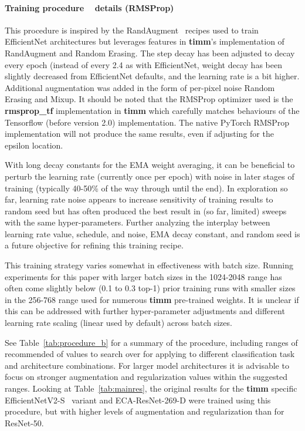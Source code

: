 \paragraph{Training procedure \Bp~ details (RMSProp)}
This procedure is inspired by the RandAugment~\cite{Cubuk2019RandAugmentPA} recipes used to train EfficientNet architectures but leverages features in \textbf{timm}’s implementation of RandAugment and Random Erasing. The step decay has been adjusted to decay every epoch (instead of every 2.4 as with EfficientNet, weight decay has been slightly decreased from EfficientNet defaults, and the learning rate is a bit higher. Additional augmentation was added in the form of per-pixel noise Random Erasing and Mixup. It should be noted that the RMSProp optimizer used is the \textbf{rmsprop\_tf} implementation in \textbf{timm} which carefully matches behaviours of the Tensorflow (before version 2.0) implementation. The native PyTorch RMSProp implementation will not produce the same results, even if adjusting for the epsilon location.

With long decay constants for the EMA weight averaging, it can be beneficial to perturb the learning rate (currently once per epoch) with noise in later stages of training (typically 40-50\% of the way through until the end). In exploration so far, learning rate noise appears to increase sensitivity of training results to random seed but has often produced the best result in (so far, limited) sweeps with the same hyper-parameters. Further analyzing the interplay between learning rate value, schedule, and noise, EMA decay constant, and random seed is a future objective for refining this training recipe.

This training strategy varies somewhat in effectiveness with batch size. Running experiments for this paper with larger batch sizes in the 1024-2048 range has often come slightly below (0.1 to 0.3 top-1) prior training runs with smaller sizes in the 256-768 range used for numerous \textbf{timm} pre-trained weights. It is unclear if this can be addressed with further hyper-parameter adjustments and different learning rate scaling (linear used by default) across batch sizes.

See Table~\ref{tab:procedure_b} for a summary of the procedure, including ranges of recommended of values to search over for applying to different classification task and architecture combinations. For larger model architectures it is advisable to focus on stronger augmentation and regularization values within the suggested ranges. Looking at Table~\ref{tab:mainres}, the original results for the \textbf{timm} specific EfficientNetV2-S~\cite{Tan2021EfficientNetV2SM} variant and ECA-ResNet-269-D were trained using this procedure, but with higher levels of augmentation and regularization than for ResNet-50.


